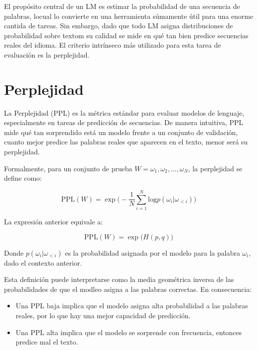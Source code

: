 El propósito central de un LM es estimar la probabilidad de una secuencia de palabras, locual lo convierte 
en una herramienta súmamente útil para una enorme cantida de tareas. Sin embargo, dado que todo LM 
asigna distribuciones de probabilidad sobre textom su calidad se mide en qué tan bien predice 
secuencias reales del idioma. El criterio intrínseco más utilizado para esta tarea de evaluación es
la perplejidad. 

\section*{Perplejidad}

La Perplejidad (PPL) es la métrica estándar para evaluar modelos de lenguaje, especialmente
en tareas de predicción de secuencias. De manera intuitiva, PPL mide qué tan sorprendido
está un modelo frente a un conjunto de validación, cuanto mejor predice las palabras
reales que aparecen en el texto, menor será su perplejidad. 

Formalmente, para un conjunto de prueba $W = \omega_1, \omega_2,..., \omega_N$, la perplejidad
se define como:

\[
    \text{PPL}(W) = \exp \Big(- \frac{1}{N} \sum_{i=1}^{N} \text{log} p(\omega_i | \omega_{<i})\Big)
\]

La expresión anterior equivale a:

\[
    \text{PPL}(W) = \exp \Big(H(p,q) \Big)
\]

Donde $p(\omega_i | \omega_{<i})$ es la probabilidad asignada por el modelo para la palabra
$\omega_i$, dado el contexto anterior. 

Esta definición puede interpretarse como la media geométrica inversa de las probabilidades 
de que el modleo asigna a las palabras correctas. En consecuencia:

\begin{itemize}
    \item Una PPL baja implica que el modelo asigna alta probabilidad a las palabras reales, por
    lo que hay una mejor capacidad de predicción.
    \item Una PPL alta implica que el modelo se sorprende con frecuencia, entonces predice
    mal el texto.
\end{itemize}


